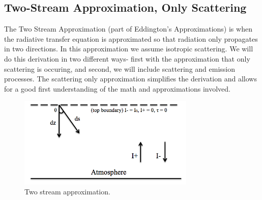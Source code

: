\documentclass{article}
\begin{document}
 
 \subsection*{Two-Stream Approximation, Only Scattering}
 The Two Stream Approximation (part of Eddington's Approximations) is when the radiative transfer equation is approximated so that radiation only propagates in two directions. In this approximation we assume isotropic scattering.
 We will do this derivation in two different ways- first with the approximation that only scattering is occuring, and second, we will include scattering and emission processes. The scattering only approximation simplifies the derivation and allows for a good first understanding of the math and approximations involved.
 
\begin{figure}
    \centering
    \includegraphics[width=0.75\textwidth]{Twostream2.png}
    \caption{Two stream approximation. }
    \label{fig:twostream}
\end{figure} %
\end{document}
